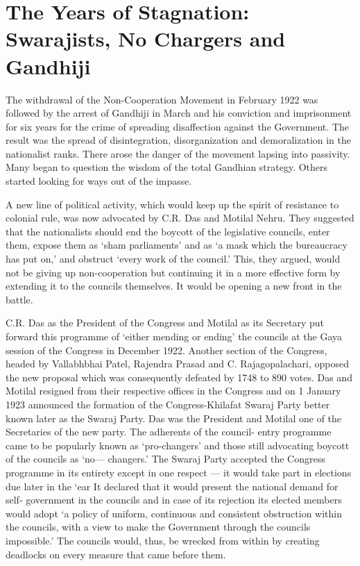 \chapter[The Years of Stagnation]{The Years of Stagnation: Swarajists, No Chargers and Gandhiji}



The withdrawal of the Non-Cooperation Movement in February 1922 was followed by the arrest of Gandhiji in March and his conviction and imprisonment for six years for the crime of spreading disaffection against the Government. The result was the spread of disintegration, disorganization and demoralization in the nationalist ranks. There arose the danger of the movement lapsing into passivity. Many began to question the wisdom of the total Gandhian strategy. Others started looking for ways out of the impasse.

A new line of political activity, which would keep up the spirit of resistance to colonial rule, was now advocated by C.R. Das and Motilal Nehru. They suggested that the nationalists should end the boycott of the legislative councils, enter them, expose them as `sham parliaments' and as `a mask which the bureaucracy has put on,' and obstruct `every work of the council.' This, they argued, would not be giving up non-cooperation but continuing it in a more effective form by extending it to the councils themselves. It would be opening a new front in the battle.

C.R. Das as the President of the Congress and Motilal as its Secretary put forward this programme of `either mending or ending' the councils at the Gaya session of the Congress in December 1922. Another section of the Congress, headed by Vallabhbhai Patel, Rajendra Prasad and C. Rajagopalachari, opposed the new proposal which was consequently defeated by 1748 to 890 votes. Das and Motilal resigned from their respective offices in the Congress and on 1 January 1923 announced the formation of the Congress-Khilafat Swaraj Party better known later as the Swaraj Party. Das was the President and Motilal one of the Secretaries of the new party. The adherents of the council- entry programme came to be popularly known as `pro-changers' and those still advocating boycott of the councils as `no— changers.' The Swaraj Party accepted the Congress programme in its entirety except in one respect — it would take part in elections due later in the `ear It declared that it would present the national demand for self- government in the councils and in case of its rejection its elected members would adopt `a policy of uniform, continuous and consistent obstruction within the councils, with a view to make the Government through the councils impossible.' The councils would, thus, be wrecked from within by creating deadlocks on every measure that came before them.

